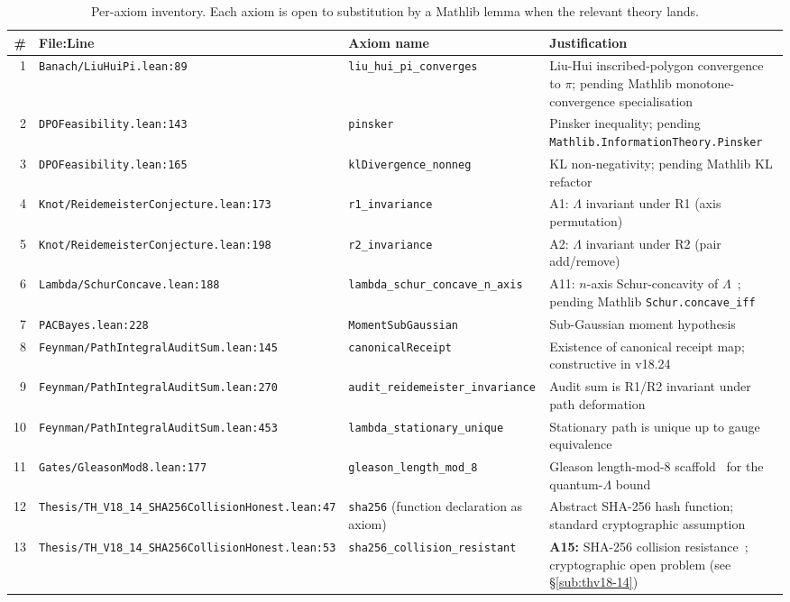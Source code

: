 \begin{table}[h!]
\centering\small
\caption{Per-axiom inventory. Each axiom is open to substitution by
a Mathlib lemma when the relevant theory lands.}
\label{tab:axiom-inventory-ch07}
\begin{tabular}{rllp{4.0cm}}
\hline
\textbf{\#} & \textbf{File:Line} & \textbf{Axiom name} & \textbf{Justification} \\
\hline
1 & \texttt{Banach/LiuHuiPi.lean:89} & \texttt{liu\_hui\_pi\_converges} & Liu-Hui inscribed-polygon convergence to $\pi$; pending Mathlib monotone-convergence specialisation \\
2 & \texttt{DPOFeasibility.lean:143} & \texttt{pinsker} & Pinsker inequality; pending \texttt{Mathlib.InformationTheory.Pinsker} \\
3 & \texttt{DPOFeasibility.lean:165} & \texttt{klDivergence\_nonneg} & KL non-negativity; pending Mathlib KL refactor \\
4 & \texttt{Knot/ReidemeisterConjecture.lean:173} & \texttt{r1\_invariance} & A1: $\Lambda$ invariant under R1 (axis permutation)~\cite{Reidemeister1927} \\
5 & \texttt{Knot/ReidemeisterConjecture.lean:198} & \texttt{r2\_invariance} & A2: $\Lambda$ invariant under R2 (pair add/remove)~\cite{Reidemeister1927} \\
6 & \texttt{Lambda/SchurConcave.lean:188} & \texttt{lambda\_schur\_concave\_n\_axis} & A11: $n$-axis Schur-concavity of $\Lambda$~\cite{HLP1934}; pending Mathlib \texttt{Schur.concave\_iff} \\
7 & \texttt{PACBayes.lean:228} & \texttt{MomentSubGaussian} & Sub-Gaussian moment hypothesis~\cite{Vershynin2018} \\
8 & \texttt{Feynman/PathIntegralAuditSum.lean:145} & \texttt{canonicalReceipt} & Existence of canonical receipt map; constructive in v18.24 \\
9 & \texttt{Feynman/PathIntegralAuditSum.lean:270} & \texttt{audit\_reidemeister\_invariance} & Audit sum is R1/R2 invariant under path deformation \\
10 & \texttt{Feynman/PathIntegralAuditSum.lean:453} & \texttt{lambda\_stationary\_unique} & Stationary path is unique up to gauge equivalence \\
11 & \texttt{Gates/GleasonMod8.lean:177} & \texttt{gleason\_length\_mod\_8} & Gleason length-mod-8 scaffold~\cite{Gleason1957} for the quantum-$\Lambda$ bound \\
12 & \texttt{Thesis/TH\_V18\_14\_SHA256CollisionHonest.lean:47} & \texttt{sha256} (function declaration as axiom) & Abstract SHA-256 hash function; standard cryptographic assumption \\
13 & \texttt{Thesis/TH\_V18\_14\_SHA256CollisionHonest.lean:53} & \texttt{sha256\_collision\_resistant} & \textbf{A15:} SHA-256 collision resistance~\cite{NIST-FIPS-180-4}; cryptographic open problem (see \S\ref{sub:thv18-14}) \\
\hline
\end{tabular}
\end{table}


